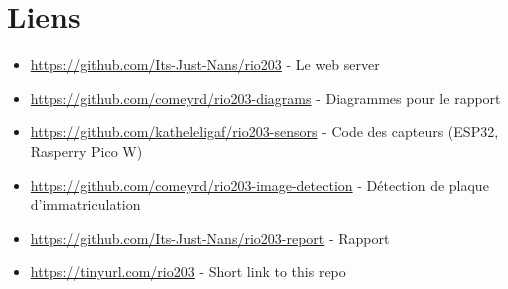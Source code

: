 \section*{Liens}


\begin{itemize}
    \item \url{https://github.com/Its-Just-Nans/rio203} - Le web server
    \item \url{https://github.com/comeyrd/rio203-diagrams} - Diagrammes pour le rapport
    \item \url{https://github.com/katheleligaf/rio203-sensors} - Code des capteurs (ESP32, Rasperry Pico W)
    \item \url{https://github.com/comeyrd/rio203-image-detection} - Détection de plaque d'immatriculation
    \item \url{https://github.com/Its-Just-Nans/rio203-report} - Rapport
    \item \url{https://tinyurl.com/rio203} - Short link to this repo
\end{itemize}
